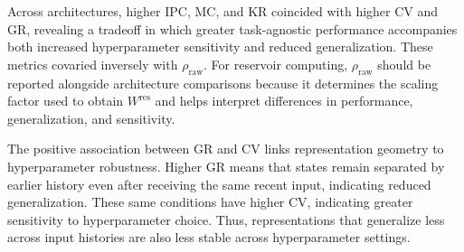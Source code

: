 \documentclass[mlabstract,onecolumn]{jmlr}
\begin{document}
Across architectures, higher IPC, MC, and KR coincided with higher CV and GR, revealing a tradeoff in which greater task-agnostic performance accompanies both increased hyperparameter sensitivity and reduced generalization. These metrics covaried inversely with \(\rho_{\mathrm{raw}}\). For reservoir computing, \(\rho_{\mathrm{raw}}\) should be reported alongside architecture comparisons because it determines the scaling factor used to obtain \(W^{\mathrm{res}}\) and helps interpret differences in performance, generalization, and sensitivity.

The positive association between GR and CV links representation geometry to hyperparameter robustness. Higher GR means that states remain separated by earlier history even after receiving the same recent input, indicating reduced generalization. These same conditions have higher CV, indicating greater sensitivity to hyperparameter choice. Thus, representations that generalize less across input histories are also less stable across hyperparameter settings.
\clearpage

\end{document}
